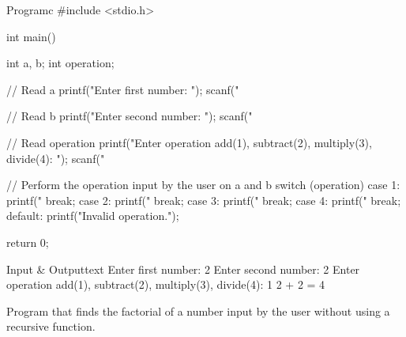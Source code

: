 \documentclass[11pt]{ipu-c}
\begin{document}
    \begin{flowchart}
    \end{flowchart}

    \newpage
    \begin{code}
        {Program}{c}
#include <stdio.h>

int main() {
    int a, b;
    int operation;

    // Read a
    printf("Enter first number: ");
    scanf("%

    // Read b
    printf("Enter second number: ");
    scanf("%

    // Read operation
    printf("Enter operation add(1), subtract(2), multiply(3), divide(4): ");
    scanf("%

    // Perform the operation input by the user on a and b
    switch (operation) {
        case 1:
            printf("%
            break;
        case 2:
            printf("%
            break;
        case 3:
            printf("%
            break;
        case 4:
            printf("%
            break;
        default:
            printf("Invalid operation.");
    }

    return 0;
}
    \end{code}
    \begin{code}
        {Input \& Output}{text}
Enter first number: 2
Enter second number: 2
Enter operation add(1), subtract(2), multiply(3), divide(4): 1
2 + 2 = 4
    \end{code}


    {Program that finds the factorial of a number input by the user without using a recursive function.}
\end{document}
